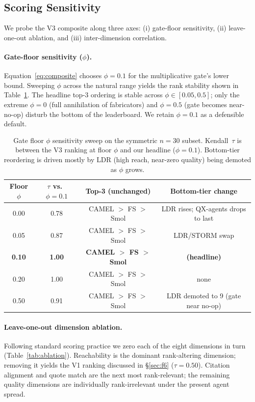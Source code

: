 \documentclass{article}
\begin{document}
\subsection{Scoring Sensitivity}
\label{sec:ablation}

We probe the V3 composite along three axes: (i) gate-floor sensitivity, (ii) leave-one-out ablation, and (iii) inter-dimension correlation.

\paragraph{Gate-floor sensitivity ($\phi$).} Equation~\eqref{eq:composite} chooses $\phi{=}0.1$ for the multiplicative gate's lower bound. Sweeping $\phi$ across the natural range yields the rank stability shown in Table~\ref{tab:floor}. The headline top-3 ordering is stable across $\phi \in [0.05, 0.5]$; only the extreme $\phi{=}0$ (full annihilation of fabricators) and $\phi{=}0.5$ (gate becomes near-no-op) disturb the bottom of the leaderboard. We retain $\phi{=}0.1$ as a defensible default.

\begin{table}[t]
\centering
\caption{Gate floor $\phi$ sensitivity sweep on the symmetric $n{=}30$ subset. Kendall~$\tau$ is between the V3 ranking at floor $\phi$ and our headline ($\phi{=}0.1$). Bottom-tier reordering is driven mostly by LDR (high reach, near-zero quality) being demoted as $\phi$ grows.}
\label{tab:floor}
\vspace{1mm}
\small
\begin{tabular}{@{}cccc@{}}
\toprule
\textbf{Floor $\phi$} & \textbf{$\tau$ vs.\ $\phi{=}0.1$} & \textbf{Top-3 (unchanged)} & \textbf{Bottom-tier change} \\
\midrule
0.00 & 0.78 & CAMEL $>$ FS $>$ Smol & LDR rises; QX-agents drops to last \\
0.05 & 0.87 & CAMEL $>$ FS $>$ Smol & LDR/STORM swap \\
\textbf{0.10} & \textbf{1.00} & \textbf{CAMEL $>$ FS $>$ Smol} & \textbf{(headline)} \\
0.20 & 1.00 & CAMEL $>$ FS $>$ Smol & none \\
0.50 & 0.91 & CAMEL $>$ FS $>$ Smol & LDR demoted to 9 (gate near no-op) \\
\bottomrule
\end{tabular}
\end{table}

\paragraph{Leave-one-out dimension ablation.} Following standard scoring practice we zero each of the eight dimensions in turn (Table~\ref{tab:ablation}). Reachability is the dominant rank-altering dimension; removing it yields the V1 ranking discussed in \S\ref{sec:f6} ($\tau{=}0.50$). Citation alignment and quote match are the next most rank-relevant; the remaining quality dimensions are individually rank-irrelevant under the present agent spread.
\end{document}
